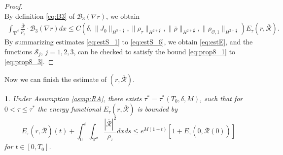 \documentclass[english]{amsart}
\theoremstyle{plain}
\theoremstyle{definition}
\theoremstyle{remark}
\theoremstyle{plain}
\theoremstyle{plain}
\newtheorem{prop}[thm]{\protect\propositionname}
\theoremstyle{plain}
\providecommand{\propositionname}{Proposition}
\def\T{{\mathbf T}}%
\numberwithin{equation}{section}
\begin{document}
\begin{proof}
\[\]
By definition \eqref{eq:B3} of $\mathcal{B}_3(\nabla r)$, we obtain
\begin{equation}\label{eq:estS_6}
\begin{aligned}
\int_{\T^d}\frac{\overline{\mathcal{R}}}{\rho_\tau}\cdot\mathcal{B}_3(\nabla r)dx\leq C(\delta,\|J_0\|_{H^{3+\frac{d}{2}}},\|\rho_\tau\|_{H^{2+\frac{d}{2}}},\|\bar\rho\|_{H^{2+\frac{d}{2}}},\|\rho_{\mathcal{O},1}\|_{H^{2+\frac{d}{2}}})E_\tau(r,\overline{\mathcal{R}}).
\end{aligned}
\end{equation}
By summarizing estimates \eqref{eq:estS_1} to \eqref{eq:estS_6}, we obtain \eqref{eq:estE}, and the functions $\mathcal{S}_j$, $j=1,2,3$, can be checked to satisfy the bound \eqref{eq:prop8_1} to \eqref{eq:prop8_3}.
\end{proof}

Now we can finish the estimate of $(r,\overline{\mathcal{R}})$.

\begin{prop}\label{prop:bd_en}
Under Assumption \ref{asmp:RA}, there exists $\tau^*=\tau^*(T_0,\delta,M)$, such that for $0<\tau\leq \tau^*$ the energy functional $E_\tau(r,\overline{\mathcal{R}})$ is bounded by
\begin{equation}\label{eq:propEr}
E_\tau(r,\overline{\mathcal{R}})(t)+\int_0^t\int_{{\T^d}} \frac{|\overline{\mathcal{R}}|^2}{\rho_\tau}dxds\leq e^{M(1+t)}\left[1+E_\tau(0,\overline{\mathcal{R}}(0))\right]
\end{equation}
for $t\in [0,T_0]$.
\end{prop}
\end{document}
